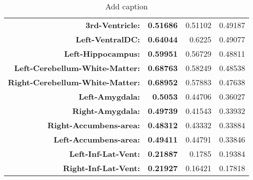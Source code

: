 \begin{table}[htbp]
{\begin{tabular}{rrrr}
    \textbf{3rd-Ventricle:} & \textbf{0.51686} & 0.51102 & 0.49187 \\
    \textbf{Left-VentralDC:} & \textbf{0.64044} & 0.6225 & 0.49077 \\
    \textbf{Left-Hippocampus:} & \textbf{0.59951} & 0.56729 & 0.48811 \\
    \textbf{Left-Cerebellum-White-Matter:} & \textbf{0.68763} & 0.58249 & 0.48538 \\
    \textbf{Right-Cerebellum-White-Matter:} & \textbf{0.68952} & 0.57883 & 0.47638 \\
    \textbf{Left-Amygdala:} & \textbf{0.5053} & 0.44706 & 0.36027 \\
    \textbf{Right-Amygdala:} & \textbf{0.49739} & 0.41543 & 0.33932 \\
    \textbf{Right-Accumbens-area:} & \textbf{0.48312} & 0.43332 & 0.33884 \\
    \textbf{Left-Accumbens-area:} & \textbf{0.49411} & 0.44791 & 0.33846 \\
    \textbf{Left-Inf-Lat-Vent:} & \textbf{0.21887} & 0.1785 & 0.19384 \\
    \textbf{Right-Inf-Lat-Vent:} & \textbf{0.21927} & 0.16421 & 0.17818 \\
    \bottomrule
    \end{tabular}%
    \caption{Add caption}
  \label{tab:addlabel}}%
\end{table}%
